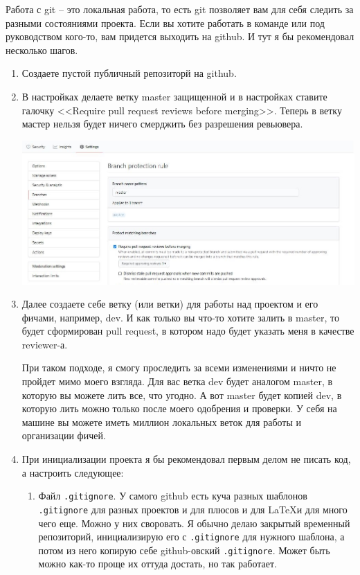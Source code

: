 \documentclass{article}
\begin{document}
Работа с git -- это локальная работа, то есть git позволяет вам для себя следить за разными состояниями проекта. Если вы хотите работать в команде или под руководством кого-то, вам придется выходить на github. И тут я бы рекомендовал несколько шагов.
\begin{enumerate}
\item Создаете пустой публичный репозиторй на github.

\item В настройках делаете ветку master защищенной и в настройках ставите галочку <<Require pull request reviews before merging>>. Теперь в ветку мастер нельзя будет ничего смерджить без разрешения ревьювера.
\begin{center}
\includegraphics[scale = 1.0]{protected.jpg}
\end{center}


\item Далее создаете себе ветку (или ветки) для работы над проектом и его фичами, например, dev. И как только вы что-то хотите залить в master, то будет сформирован pull request, в котором надо будет указать меня в качестве reviewer-а.

При таком подходе, я смогу проследить за всеми изменениями и ничто не пройдет мимо моего взгляда. Для вас ветка dev будет аналогом master, в которую вы можете лить все, что угодно. А вот master будет копией dev, в которую лить можно только после моего одобрения и проверки. У себя на машине вы можете иметь миллион локальных веток для работы и организации фичей.

\item При инициализации проекта я бы рекомендовал первым делом не писать код, а настроить следующее:
\begin{enumerate}
\item Файл \verb".gitignore". У самого github есть куча разных шаблонов \verb".gitignore" для разных проектов и для плюсов и для \LaTeX и для много чего еще. Можно у них своровать. Я обычно делаю закрытый временный репозиторий, инициализирую его с \verb".gitignore" для нужного шаблона, а потом из него копирую себе github-овский \verb".gitignore". Может быть можно как-то проще их оттуда достать, но так работает.


\end{enumerate}
\end{enumerate}
\end{document}
